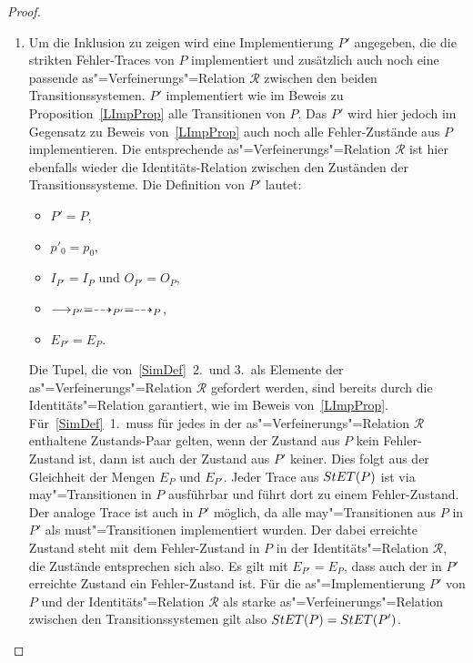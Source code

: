 \begin{proof}\mbox{}
  \begin{enumerate}
    \item Um die Inklusion zu zeigen wird eine Implementierung $P'$ angegeben,
      die die strikten Fehler-Traces von $P$ implementiert und zusätzlich auch
      noch eine passende as"=Verfeinerungs"=Relation $\mathcal{R}$ zwischen den
      beiden Transitionssystemen. $P'$ implementiert wie im Beweis zu
      Proposition~\ref{LImpProp} alle Transitionen von $P$. Das $P'$ wird hier
      jedoch im Gegensatz zu Beweis von~\ref{LImpProp} auch noch alle
      Fehler-Zustände aus $P$ implementieren. Die entsprechende
      as"=Verfeinerungs"=Relation $\mathcal{R}$ ist hier ebenfalls wieder die
      Identitäts-Relation zwischen den Zuständen der Transitionssysteme. Die
      Definition von $P'$ lautet:
      \begin{itemize}
        \item $P'=P$,
        \item $p'_0=p_0$,
        \item $I_{P'}=I_P$ und $O_{P'}=O_P$,
        \item $\must _{P'} =\may _{P'} = \may _P$,
        \item $E_{P'}=E_P$.
      \end{itemize}
      Die Tupel, die von~\ref{SimDef}~2.\ und 3.\ als Elemente der
      as"=Verfeinerungs"=Relation $\mathcal{R}$ gefordert werden, sind bereits
      durch die Identitäts"=Relation garantiert, wie im Beweis
      von~\ref{LImpProp}. Für~\ref{SimDef}~1.\ muss für jedes in der
      as"=Verfeinerungs"=Relation $\mathcal{R}$ enthaltene Zustands-Paar
      gelten, wenn der Zustand aus $P$ kein Fehler-Zustand ist, dann ist auch
      der Zustand aus $P'$ keiner. Dies folgt aus der Gleichheit der Mengen
      $E_P$ und $E_{P'}$. Jeder Trace aus $StET (P)$ ist via may"=Transitionen
      in $P$ ausführbar und führt dort zu einem Fehler-Zustand. Der analoge
      Trace ist auch in $P'$ möglich, da alle may"=Transitionen aus $P$ in $P'$
      als must"=Transitionen implementiert wurden. Der dabei erreichte Zustand
      steht mit dem Fehler-Zustand in $P$ in der Identitäts"=Relation
      $\mathcal{R}$, die Zustände entsprechen sich also. Es gilt mit
      $E_{P'}=E_P$, dass auch der in $P'$ erreichte Zustand ein Fehler-Zustand
      ist. Für die as"=Implementierung $P'$ von $P$ und der
      Identitäts"=Relation $\mathcal{R}$ als starke as"=Verfeinerungs"=Relation
      zwischen den Transitionssystemen gilt also $StET (P) =StET (P')$.

\end{enumerate}
\end{proof}
